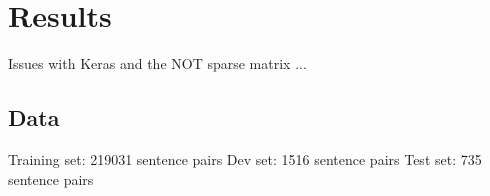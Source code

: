 
\chapter{Results} %

\label{Chapter4} %

Issues with Keras and the NOT sparse matrix ...


\section{Data}
Training set: 219031 sentence pairs
Dev set: 1516 sentence pairs
Test set: 735 sentence pairs

